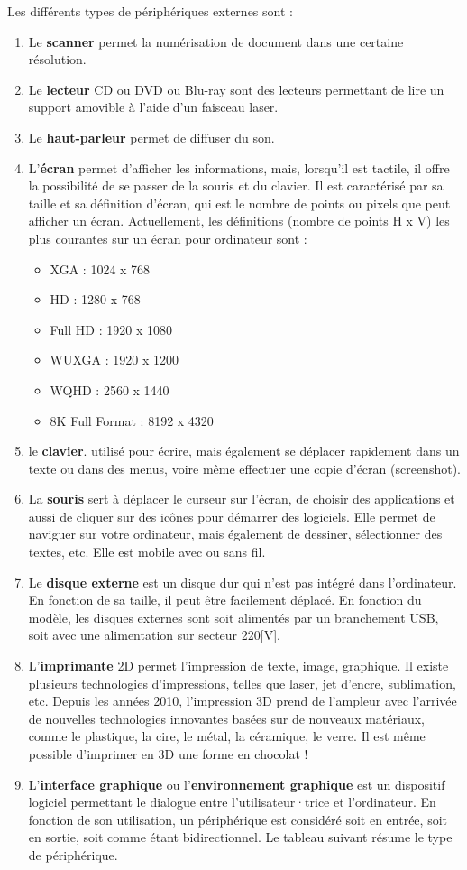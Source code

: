 \documentclass[11pt, a4paper]{book}
\begin{document}
Les différents types de périphériques externes sont :
\begin{enumerate}[1)]
    \item Le {\bf scanner} permet la numérisation de document dans une certaine résolution.
    \item Le {\bf lecteur} CD ou DVD ou Blu-ray sont des lecteurs permettant de lire un support amovible à l’aide d’un faisceau laser.
    \item Le {\bf haut-parleur} permet de diffuser du son.
    \item L’{\bf écran} permet d’afficher les informations, mais, lorsqu’il est tactile, il offre la possibilité de se passer de la souris et du clavier. Il est caractérisé par sa taille et sa définition d’écran, qui est le nombre de points ou pixels que peut afficher un écran. Actuellement, les définitions (nombre de points H x V) les plus courantes sur un écran pour ordinateur sont :
    	\begin{itemize}
            	\item XGA : 1024 x 768
            	\item  HD : 1280 x 768
            	\item  Full HD : 1920 x 1080
            	\item WUXGA : 1920 x 1200
            	\item  WQHD : 2560 x 1440
            	\item 8K Full Format : 8192 x 4320
           \end{itemize}
    \item le {\bf clavier}. utilisé pour écrire, mais également se déplacer rapidement dans un texte ou dans des menus, voire même effectuer une copie d’écran (screenshot).
    \item La {\bf souris} sert à déplacer le curseur sur l’écran, de choisir des applications et aussi de cliquer sur des icônes pour démarrer des logiciels. Elle permet de naviguer sur votre ordinateur, mais également de dessiner, sélectionner des textes, etc. Elle est mobile avec ou sans fil.
    \item Le {\bf disque externe} est un disque dur qui n’est pas intégré dans l’ordinateur. En fonction de sa taille, il peut être facilement déplacé. En fonction du modèle, les disques externes sont soit alimentés par un branchement USB, soit avec une alimentation sur secteur 220[V].
    \item L’{\bf imprimante} 2D permet l’impression de texte, image, graphique. Il existe plusieurs technologies d’impressions, telles que laser, jet d’encre, sublimation, etc. Depuis les années 2010, l’impression 3D prend de l’ampleur avec l’arrivée de nouvelles technologies innovantes basées sur de nouveaux matériaux, comme le plastique, la cire, le métal, la céramique, le verre. Il est même possible d’imprimer en 3D une forme en chocolat !
    \item L’{\bf interface graphique} ou l’{\bf environnement graphique} est un dispositif logiciel permettant le dialogue entre l’utilisateur·trice et l’ordinateur.
En fonction de son utilisation, un périphérique est considéré soit en entrée, soit en sortie, soit comme étant bidirectionnel. Le tableau suivant résume le type de périphérique.
\end{enumerate}
\end{document}
